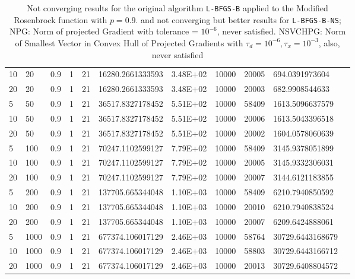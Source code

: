 \begin{table}
\begin{center}
\begin{tabular}{|l|l|l|l|l|l|l|l|l|l|l|}
      10 & 20 & 0.9 & 1 & 21 & 16280.2661333593 & 3.48E+02 & 10000 & 20005 & 694.0391973604 & \\
      20 & 20 & 0.9 & 1 & 21 & 16280.2661333593 & 3.48E+02 & 10000 & 20003 & 682.9908544633 & \\
      5 & 50 & 0.9 & 1 & 21 & 36517.8327178452 & 5.51E+02 & 10000 & 58409 & 1613.5096637579 & \\
      10 & 50 & 0.9 & 1 & 21 & 36517.8327178452 & 5.51E+02 & 10000 & 20006 & 1613.5043396518 & \\
      20 & 50 & 0.9 & 1 & 21 & 36517.8327178452 & 5.51E+02 & 10000 & 20002 & 1604.0578060639 & \\
      5 & 100 & 0.9 & 1 & 21 & 70247.1102599127 & 7.79E+02 & 10000 & 58409 & 3145.9378051899 & \\
      10 & 100 & 0.9 & 1 & 21 & 70247.1102599127 & 7.79E+02 & 10000 & 20005 & 3145.9332306031 & \\
      20 & 100 & 0.9 & 1 & 21 & 70247.1102599127 & 7.79E+02 & 10000 & 20007 & 3144.6121183855 & \\
      5 & 200 & 0.9 & 1 & 21 & 137705.665344048 & 1.10E+03 & 10000 & 58409 & 6210.7940850592 & \\
      10 & 200 & 0.9 & 1 & 21 & 137705.665344048 & 1.10E+03 & 10000 & 20010 & 6210.7940838524 & \\
      20 & 200 & 0.9 & 1 & 21 & 137705.665344048 & 1.10E+03 & 10000 & 20007 & 6209.6424888061 & \\
      5 & 1000 & 0.9 & 1 & 21 & 677374.106017129 & 2.46E+03 & 10000 & 58764 & 30729.6443168679 & \\
      10 & 1000 & 0.9 & 1 & 21 & 677374.106017129 & 2.46E+03 & 10000 & 58803 & 30729.6443166712 & \\
      20 & 1000 & 0.9 & 1 & 21 & 677374.106017129 & 2.46E+03 & 10000 & 20013 & 30729.6408804572 & \\
      \hline
    \end{tabular}
    \caption[A value where \texttt{L-BFGS-B-NS} is supposed to fail. $p = 0.9$]{Not converging results for the original algorithm \texttt{L-BFGS-B} applied to the Modified Rosenbrock function with $p = 0.9$.  and not converging but better results for \texttt{L-BFGS-B-NS}; NPG: Norm of projected Gradient with tolerance = $10^{-6}$, never satisfied. NSVCHPG: Norm of Smallest Vector in Convex Hull of Projected Gradients with $\tau_d = 10^{-6}, \tau_x = 10^{-3}$, also, never satisfied}
    \label{p09}
  \end{center}
\end{table}

\pagebreak
\pagebreak
\clearpage
